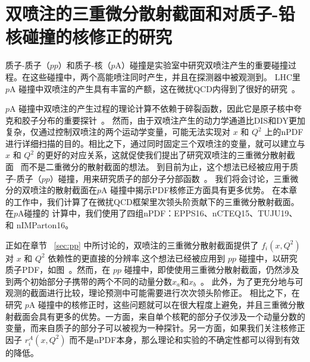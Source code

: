 


\chapter{双喷注的三重微分散射截面和对质子-铅核碰撞的核修正的研究}
\label{sec:triple}



质子-质子（$pp$）和质子-核（$p$A）碰撞是实验室中研究双喷注产生的重要碰撞过程。在这些碰撞中，两个高能喷注同时产生，并且在探测器中被观测到。
LHC里 $p$A 碰撞中双喷注的产生具有丰富的产额，这在微扰QCD内得到了很好的研究~\parencite{Ellis:1992en,Ellis:1994dg,Nagy:2001fj,Nagy:2003tz,Gehrmann-DeRidder:2019ibf,Kunszt:1992tn,Gao:2012he}。




$p$A 碰撞中双喷注的产生过程的理论计算不依赖于碎裂函数，因此它是原子核中夸克和胶子分布的重要探针~\parencite{Eskola:2013aya,He:2011sg}。
然而，由于双喷注产生的动力学通道比DIS和DY更加复杂，仅通过控制双喷注的两个运动学变量，可能无法实现对 $x$ 和 $Q^2$ 上的nPDF进行详细扫描的目的。相比之下，通过同时固定三个双喷注的变量，就可以建立与 $x$ 和 $Q^2$ 的更好的对应关系，这就促使我们提出了研究双喷注的三重微分散射截面~\parencite{Ellis:1994dg,CMS:2017jfq,Gehrmann-DeRidder:2019ibf} 而不是二重微分的散射截面的想法。
到目前为止，这个想法已经被应用于质子-质子（$pp$）碰撞，用来研究质子的部分子分部函数~\parencite{Ellis:1994dg,CMS:2017jfq,Gehrmann-DeRidder:2019ibf}。
我们将会讨论，三重微分的双喷注的散射截面在$p$A 碰撞中揭示PDF核修正方面具有更多优势。
在本章的工作中，我们计算了在微扰QCD框架里次领头阶贡献下的三重微分散射截面。在$p$A碰撞的 计算中，我们使用了四组nPDF：EPPS16、nCTEQ15、TUJU19、和 nIMParton16。

正如在章节 ~\ref{sec:pp} 中所讨论的，双喷注的三重微分散射截面提供了 $f_i(x,Q^2)$ 对 $x$ 和 $Q^2$ 依赖性的更直接的分辨率,这个想法已经被应用到 $pp$ 碰撞中，以研究质子PDF，如图~\parencite{Ellis:1994dg,CMS:2017jfq,Gehrmann-DeRidder:2019ibf}。然而，在 $pp$ 碰撞中，即使使用三重微分散射截面，仍然涉及到两个初始部分子携带的两个不同的动量分数$ x_a $和$ x_b $~\parencite{Gehrmann-DeRidder:2019ibf}。
此外，为了更充分地与可观测的截面进行比较，理论预测中可能需要进行次次领头阶修正。
相比之下，在研究 $p$A 碰撞中的核修正时，这些问题就可以在很大程度上避免，并且三重微分散射截面会具有更多的优势。一方面，来自单个核靶的部分子仅涉及一个动量分数的变量，而来自质子的部分子可以被视为一种探针。另一方面，如果我们关注核修正因子 $r^A_i(x,Q^2)$ 而不是nPDF本身，那么理论和实验的不确定性都可以得到有效的降低。

